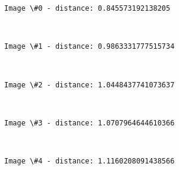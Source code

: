 \documentclass[11pt]{article}
\begin{document}
    \begin{Verbatim}[commandchars=\\\{\}]
Image \#0 - distance: 0.845573192138205

    \end{Verbatim}

    \begin{center}
    \end{center}
    { \hspace*{\fill} \\}
    
    \begin{Verbatim}[commandchars=\\\{\}]
Image \#1 - distance: 0.9863331777515734

    \end{Verbatim}

    \begin{center}
    \end{center}
    { \hspace*{\fill} \\}
    
    \begin{Verbatim}[commandchars=\\\{\}]
Image \#2 - distance: 1.0448437741073637

    \end{Verbatim}

    \begin{center}
    \end{center}
    { \hspace*{\fill} \\}
    
    \begin{Verbatim}[commandchars=\\\{\}]
Image \#3 - distance: 1.0707964644610366

    \end{Verbatim}

    \begin{center}
    \end{center}
    { \hspace*{\fill} \\}
    
    \begin{Verbatim}[commandchars=\\\{\}]
Image \#4 - distance: 1.1160208091438566

    \end{Verbatim}
\end{document}

